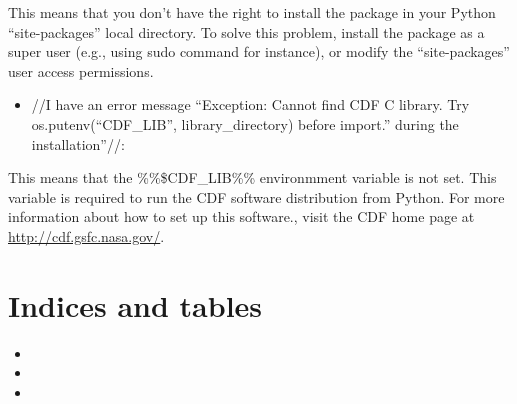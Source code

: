 \documentclass[letterpaper,10pt,english]{sphinxmanual}
\begin{document}
This means that you don't have the right to install the package in your Python ``site-packages'' local directory.
To solve this problem, install the package as a super user (e.g., using sudo command for instance), or modify the ``site-packages'' user access permissions.
\begin{itemize}
\item {} 
//I have an error message ``Exception: Cannot find CDF C library. Try os.putenv(``CDF\_LIB'', library\_directory) before import.'' during the installation''//:

\end{itemize}

This means that the \%\%\$CDF\_LIB\%\% environmment variable is not set. This variable is required to run the CDF software distribution from Python. For more information about how to set up this software., visit the CDF home page at \href{http://cdf.gsfc.nasa.gov/}{http://cdf.gsfc.nasa.gov/}.


\chapter{Indices and tables}
\label{index:indices-and-tables}\begin{itemize}
\item {} 

\item {} 

\item {} 

\end{itemize}



\renewcommand{\indexname}{Index}
\printindex
\end{document}

